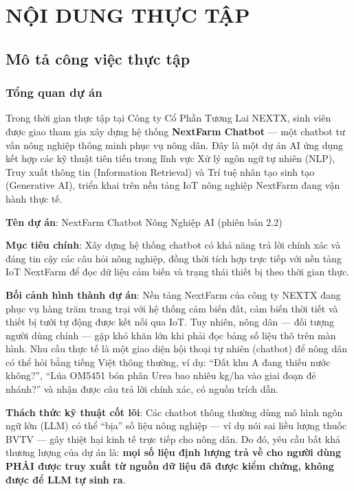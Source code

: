 
\chapter{NỘI DUNG THỰC TẬP}

\section{Mô tả công việc thực tập}

\subsection{Tổng quan dự án}

Trong thời gian thực tập tại Công ty Cổ Phần Tương Lai NEXTX, sinh viên được giao tham gia xây dựng hệ thống \textbf{NextFarm Chatbot} --- một chatbot tư vấn nông nghiệp thông minh phục vụ nông dân. Đây là một dự án AI ứng dụng kết hợp các kỹ thuật tiên tiến trong lĩnh vực Xử lý ngôn ngữ tự nhiên (NLP), Truy xuất thông tin (Information Retrieval) và Trí tuệ nhân tạo sinh tạo (Generative AI), triển khai trên nền tảng IoT nông nghiệp NextFarm đang vận hành thực tế.

\textbf{Tên dự án}: NextFarm Chatbot Nông Nghiệp AI (phiên bản 2.2)

\textbf{Mục tiêu chính}: Xây dựng hệ thống chatbot có khả năng trả lời chính xác và đáng tin cậy các câu hỏi nông nghiệp, đồng thời tích hợp trực tiếp với nền tảng IoT NextFarm để đọc dữ liệu cảm biến và trạng thái thiết bị theo thời gian thực.

\textbf{Bối cảnh hình thành dự án}: Nền tảng NextFarm của công ty NEXTX đang phục vụ hàng trăm trang trại với hệ thống cảm biến đất, cảm biến thời tiết và thiết bị tưới tự động được kết nối qua IoT. Tuy nhiên, nông dân --- đối tượng người dùng chính --- gặp khó khăn lớn khi phải đọc bảng số liệu thô trên màn hình. Nhu cầu thực tế là một giao diện hội thoại tự nhiên (chatbot) để nông dân có thể hỏi bằng tiếng Việt thông thường, ví dụ: ``Đất khu A đang thiếu nước không?'', ``Lúa OM5451 bón phân Urea bao nhiêu kg/ha vào giai đoạn đẻ nhánh?'' và nhận được câu trả lời chính xác, có nguồn trích dẫn.

\textbf{Thách thức kỹ thuật cốt lõi}: Các chatbot thông thường dùng mô hình ngôn ngữ lớn (LLM) có thể ``bịa'' số liệu nông nghiệp --- ví dụ nói sai liều lượng thuốc BVTV --- gây thiệt hại kinh tế trực tiếp cho nông dân. Do đó, yêu cầu bất khả thương lượng của dự án là: \textbf{mọi số liệu định lượng trả về cho người dùng PHẢI được truy xuất từ nguồn dữ liệu đã được kiểm chứng, không được để LLM tự sinh ra}.

